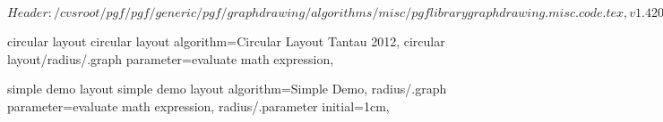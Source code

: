 %
%
%

\ProvidesFileRCS[v\pgfversion] $Header: /cvsroot/pgf/pgf/generic/pgf/graphdrawing/algorithms/misc/pgflibrarygraphdrawing.misc.code.tex,v 1.4 2012/04/03 21:17:55 tantau Exp $



%
%
\pgfgddeclarealgorithmkey
  {circular layout}
  {circular layout}
  {
    algorithm=Circular Layout Tantau 2012,
    circular layout/radius/.graph parameter=evaluate math expression,
  }


%
%
\pgfgddeclarealgorithmkey
  {simple demo layout}
  {simple demo layout}
  {
    algorithm=Simple Demo,
    radius/.graph parameter=evaluate math expression,
    radius/.parameter initial=1cm,
  }



\endinput